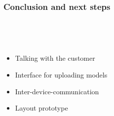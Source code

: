 \begin{frame}
  \frametitle{Conclusion and next steps}
  \begin{description}[]
    \item[Conclusion] \hfill \\
    \item[Next Steps] \hfill \\
      \begin{itemize}
        \item Talking with the customer
        \item Interface for uploading models
        \item Inter-device-communication
        \item Layout prototype
      \end{itemize}
  \end{description}  
\end{frame}


